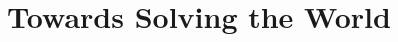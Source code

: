 \documentclass[sigconf]{acmart}
\begin{document}





\title{Towards Solving the World}












\begin{abstract}
   
\end{abstract}
\end{document}
